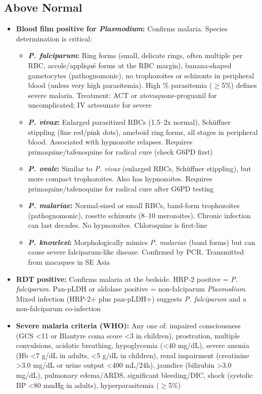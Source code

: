 \subsection*{Above Normal}
\begin{itemize}
  \item \textbf{Blood film positive for \textit{Plasmodium}:} Confirms malaria. Species determination is critical:
    \begin{itemize}
      \item \textbf{\textit{P. falciparum}:} Ring forms (small, delicate rings, often multiple per RBC, accole/appliqué forms at the RBC margin), banana-shaped gametocytes (pathognomonic), no trophozoites or schizonts in peripheral blood (unless very high parasitemia). High \% parasitemia ($\geq$5\%) defines severe malaria. Treatment: ACT or atovaquone-proguanil for uncomplicated; IV artesunate for severe
      \item \textbf{\textit{P. vivax}:} Enlarged parasitized RBCs (1.5--2x normal), Schüffner stippling (fine red/pink dots), ameboid ring forms, all stages in peripheral blood. Associated with hypnozoite relapses. Requires primaquine/tafenoquine for radical cure (check G6PD first)
      \item \textbf{\textit{P. ovale}:} Similar to \textit{P. vivax} (enlarged RBCs, Schüffner stippling), but more compact trophozoites. Also has hypnozoites. Requires primaquine/tafenoquine for radical cure after G6PD testing
      \item \textbf{\textit{P. malariae}:} Normal-sized or small RBCs, band-form trophozoites (pathognomonic), rosette schizonts (8--10 merozoites). Chronic infection can last decades. No hypnozoites. Chloroquine is first-line
      \item \textbf{\textit{P. knowlesi}:} Morphologically mimics \textit{P. malariae} (band forms) but can cause severe falciparum-like disease. Confirmed by PCR. Transmitted from macaques in SE Asia
    \end{itemize}
  \item \textbf{RDT positive:} Confirms malaria at the bedside. HRP-2 positive = \textit{P. falciparum}. Pan-pLDH or aldolase positive = non-falciparum \textit{Plasmodium}. Mixed infection (HRP-2+ plus pan-pLDH+) suggests \textit{P. falciparum} and a non-falciparum co-infection
  \item \textbf{Severe malaria criteria (WHO):} Any one of: impaired consciousness (GCS <11 or Blantyre coma score <3 in children), prostration, multiple convulsions, acidotic breathing, hypoglycemia (<40 mg/dL), severe anemia (Hb <7 g/dL in adults, <5 g/dL in children), renal impairment (creatinine >3.0 mg/dL or urine output <400 mL/24h), jaundice (bilirubin >3.0 mg/dL), pulmonary edema/ARDS, significant bleeding/DIC, shock (systolic BP <80 mmHg in adults), hyperparasitemia ($\geq$5\%)
\end{itemize}

